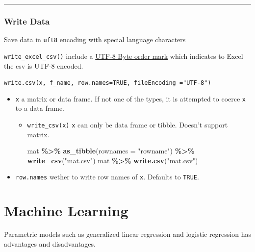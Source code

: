 \documentclass[
]{book}
\newenvironment{Shaded}{\begin{snugshade}}{\end{snugshade}}
\newcommand{\AttributeTok}[1]{\textcolor[rgb]{0.13,0.29,0.53}{#1}}
\newcommand{\FunctionTok}[1]{\textcolor[rgb]{0.13,0.29,0.53}{\textbf{#1}}}
\newcommand{\NormalTok}[1]{#1}
\newcommand{\SpecialCharTok}[1]{\textcolor[rgb]{0.81,0.36,0.00}{\textbf{#1}}}
\newcommand{\StringTok}[1]{\textcolor[rgb]{0.31,0.60,0.02}{#1}}
\begin{document}
\begin{center}\rule{0.5\linewidth}{0.5pt}\end{center}

\subsection{Write Data}\label{write-data}

Save data in \texttt{uft8} encoding with special language characters

\texttt{write\_excel\_csv()} include a \href{https://en.wikipedia.org/wiki/Byte_order_mark}{UTF-8 Byte order mark} which indicates to Excel the csv is UTF-8 encoded.

\texttt{write.csv(x,\ f\_name,\ row.names=TRUE,\ fileEncoding\ ="UTF-8")}

\begin{itemize}
\item
  \texttt{x} a matrix or data frame. If not one of the types, it is attempted to coerce \texttt{x} to a data frame.

  \begin{itemize}
  \item
    \texttt{write\_csv(x)} \texttt{x} can only be data frame or tibble. Doesn't support matrix.

\begin{Shaded}
\begin{Highlighting}[]
\NormalTok{mat }\SpecialCharTok{\%\textgreater{}\%} \FunctionTok{as\_tibble}\NormalTok{(}\AttributeTok{rownames =} \StringTok{"rowname"}\NormalTok{) }\SpecialCharTok{\%\textgreater{}\%} \FunctionTok{write\_csv}\NormalTok{(}\StringTok{"mat.csv"}\NormalTok{)}
\NormalTok{mat }\SpecialCharTok{\%\textgreater{}\%} \FunctionTok{write.csv}\NormalTok{(}\StringTok{"mat.csv"}\NormalTok{)}
\end{Highlighting}
\end{Shaded}
  \end{itemize}
\item
  \texttt{row.names} wether to write row names of \texttt{x}. Defaults to \texttt{TRUE}.
\end{itemize}

\chapter{Machine Learning}\label{machine-learning}

Parametric models such as generalized linear regression and logistic regression has advantages and disadvantages.
\end{document}
